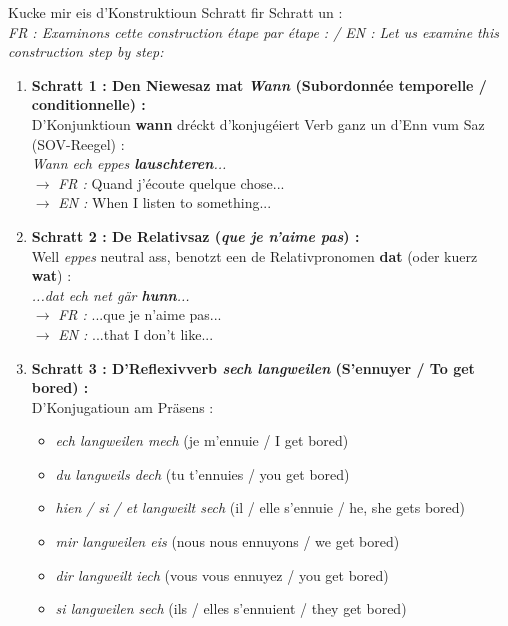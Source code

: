 \begin{center}
\end{center}

Kucke mir eis d'Konstruktioun Schratt fir Schratt un : \\
\textit{FR : Examinons cette construction étape par étape : / EN : Let us examine this construction step by step:}

\begin{enumerate}
    \item \textbf{Schratt 1 : Den Niewesaz mat \textit{Wann} (Subordonnée temporelle / conditionnelle) :} \\
    D'Konjunktioun \textbf{wann} dréckt d'konjugéiert Verb ganz un d'Enn vum Saz (SOV-Reegel) : \\
    \textit{Wann ech eppes \textbf{lauschteren}...} \\
    $\rightarrow$ \textit{FR :} Quand j'écoute quelque chose... \\
    $\rightarrow$ \textit{EN :} When I listen to something...
    
    \item \textbf{Schratt 2 : De Relativsaz (\textit{que je n'aime pas}) :} \\
    Well \textit{eppes} neutral ass, benotzt een de Relativpronomen \textbf{dat} (oder kuerz \textbf{wat}) : \\
    \textit{...dat ech net gär \textbf{hunn}...} \\
    $\rightarrow$ \textit{FR :} ...que je n'aime pas... \\
    $\rightarrow$ \textit{EN :} ...that I don't like...
    
    \item \textbf{Schratt 3 : D'Reflexivverb \textit{sech langweilen} (S'ennuyer / To get bored) :} \\
    D'Konjugatioun am Präsens :
    \begin{itemize}
        \item \textit{ech langweilen mech} (je m'ennuie / I get bored)
        \item \textit{du langweils dech} (tu t'ennuies / you get bored)
        \item \textit{hien / si / et langweilt sech} (il / elle s'ennuie / he, she gets bored)
        \item \textit{mir langweilen eis} (nous nous ennuyons / we get bored)
        \item \textit{dir langweilt iech} (vous vous ennuyez / you get bored)
        \item \textit{si langweilen sech} (ils / elles s'ennuient / they get bored)
    \end{itemize}


\end{enumerate}
